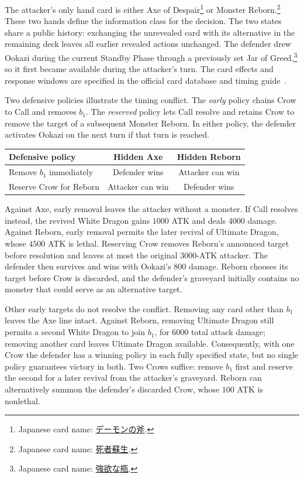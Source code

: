\documentclass[11pt,a4paper]{amsart}
\newcommand{\jp}[1]{{\japanesefont #1}}
\theoremstyle{definition}
\theoremstyle{remark}
\newcommand{\cardnote}[2]{\footnote{Japanese card name: \href{https://www.db.yugioh-card.com/yugiohdb/card_search.action?ope=2\&cid=#1\&request_locale=ja}{\jp{#2}}.}}
\begin{document}
The attacker's only hand card is either
Axe of Despair\cardnote{4310}{デーモンの斧}
or Monster Reborn.\cardnote{4842}{死者蘇生}
These two hands define the information class for the decision.
The two states share a public history: exchanging the unrevealed card with
its alternative in the remaining deck leaves all earlier revealed actions
unchanged. The defender drew Ookazi during the current Standby Phase
through a previously set Jar of Greed,\cardnote{5210}{強欲な瓶}
so it first became available during the attacker's turn.
The card effects and response windows are specified in the official card
database and timing guide~\cite{konami,timing}.

Two defensive policies illustrate the timing conflict. The \emph{early} policy
chains Crow to Call and removes $b_1$. The \emph{reserved} policy lets Call
resolve and retains Crow to remove the target of a subsequent Monster
Reborn. In either policy, the defender activates Ookazi on the next turn
if that turn is reached.

\begin{center}
\begin{tabular}{lcc}
\toprule
Defensive policy & Hidden Axe & Hidden Reborn\\
\midrule
Remove $b_1$ immediately & Defender wins & Attacker can win\\
Reserve Crow for Reborn & Attacker can win & Defender wins\\
\bottomrule
\end{tabular}
\end{center}

Against Axe, early removal leaves the attacker without a monster. If Call
resolves instead, the revived White Dragon gains $1000$ ATK and deals
$4000$ damage. Against Reborn, early removal permits the later revival of
Ultimate Dragon, whose $4500$ ATK is lethal. Reserving Crow removes Reborn's
announced target before resolution and leaves at most the original
$3000$-ATK attacker. The defender then survives and wins with Ookazi's
$800$ damage. Reborn chooses its target before Crow is discarded, and the
defender's graveyard initially contains no monster that could serve as an
alternative target.

Other early targets do not resolve the conflict. Removing any card other
than $b_1$ leaves the Axe line intact. Against Reborn, removing Ultimate
Dragon still permits a second White Dragon to join $b_1$, for $6000$ total
attack damage; removing another card leaves Ultimate Dragon available.
Consequently, with one Crow the defender has a winning policy in each fully
specified state, but no single policy guarantees victory in both. Two Crows suffice:
remove $b_1$ first and reserve the second for a later revival from the
attacker's graveyard. Reborn can alternatively summon the defender's
discarded Crow, whose $100$ ATK is nonlethal.
\end{document}
